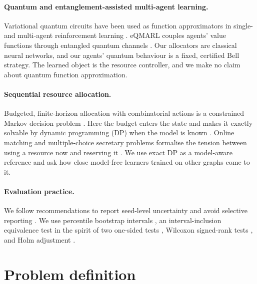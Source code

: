 \documentclass[11pt,a4paper]{article}
\begin{document}
\paragraph{Quantum and entanglement-assisted multi-agent learning.} Variational quantum circuits have been used as function approximators in single- and multi-agent reinforcement learning \cite{chen2020variational,yun2022quantum}. eQMARL couples agents' value functions through entangled quantum channels \cite{derieux2025eqmarl}. Our allocators are classical neural networks, and our agents' quantum behaviour is a fixed, certified Bell strategy. The learned object is the resource controller, and we make no claim about quantum function approximation.

\paragraph{Sequential resource allocation.} Budgeted, finite-horizon allocation with combinatorial actions is a constrained Markov decision problem \cite{puterman1994markov,altman1999constrained}. Here the budget enters the state and makes it exactly solvable by dynamic programming (DP) when the model is known \cite{puterman1994markov}. Online matching and multiple-choice secretary problems formalise the tension between using a resource now and reserving it \cite{kleinberg2005multiple,feldman2009online}. We use exact DP as a model-aware reference and ask how close model-free learners trained on other graphs come to it.

\paragraph{Evaluation practice.} We follow recommendations to report seed-level uncertainty and avoid selective reporting \cite{henderson2018deep,agarwal2021deep}. We use percentile bootstrap intervals \cite{efron1993introduction}, an interval-inclusion equivalence test in the spirit of two one-sided tests \cite{schuirmann1987comparison}, Wilcoxon signed-rank tests \cite{wilcoxon1945individual}, and Holm adjustment \cite{holm1979simple}.

\section{Problem definition}\label{sec:problem}
\end{document}
